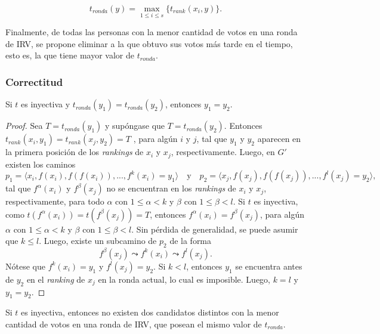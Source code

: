 \begin{equation}\label{eq:max-rank-time}
   t_{ronda}(y) = \underset{1 \leq i \leq s}{\max} \{ t_{rank}(x_i, y) \}. 
\end{equation}

Finalmente, de todas las personas con la menor cantidad de votos en una ronda de IRV, se propone eliminar a la que obtuvo sus votos m\'as tarde en el tiempo, esto es, la que tiene mayor valor  de $t_{ronda}$.

\subsubsection{Correctitud}
\begin{theorem}\label{theorem:irv}
    Si $t$ es inyectiva y $t_{ronda}(y_1) = t_{ronda}(y_2)$, entonces $y_1 = y_2$.
\end{theorem}

\begin{proof}
    Sea $T = t_{ronda}(y_1)$ y sup\'ongase que $T = t_{ronda}(y_2)$. Entonces $t_{rank}(x_{i}, y_1) = t_{rank}(x_{j}, y_2) = T$ , para alg\'un $i$ y $j$, tal que $y_1$ y $y_2$ aparecen en la primera posici\'on de los \textit{rankings} de $x_{i}$ y $x_{j}$, respectivamente. Luego, en $G'$ existen los caminos
    $$
    p_1 = \langle x_{i}, f(x_i), f(f(x_i)), ..., f^k(x_i) = y_1 \rangle \quad \text{y} \quad p_2 = \langle x_{j}, f(x_j), f(f(x_j)), ..., f^l(x_j) = y_2 \rangle,
    $$
    tal que $f^\alpha(x_i)$ y $f^\beta(x_j)$ no se encuentran en los \textit{rankings} de $x_i$ y $x_j$, respectivamente, para todo $\alpha$ con $ 1 \leq \alpha < k$ y $\beta$ con $ 1 \leq \beta < l$. Si $t$ es inyectiva, como $t(f^\alpha(x_i)) = t(f^\beta(x_j)) = T$, entonces $f^\alpha(x_i) = f^\beta(x_j)$, para alg\'un $\alpha$ con $ 1 \leq \alpha < k$ y $\beta$ con $ 1 \leq \beta < l$. Sin p\'erdida de generalidad, se puede asumir que $k \leq l$. Luego, existe un subcamino de $p_2$ de la forma
    $$
        f^\beta(x_j) \leadsto f^k(x_i) \leadsto f^l(x_j).
    $$
    N\'otese que $f^k(x_i) = y_1$ y $f^l(x_j) = y_2$.  Si $k<l$, entonces $y_1$ se encuentra antes de $y_2$ en el \textit{ranking} de $x_j$ en la ronda actual, lo cual es imposible. Luego, $k=l$ y $y_1 = y_2$.
\end{proof}

\begin{corollary}
    Si $t$ es inyectiva, entonces no existen dos candidatos distintos con la menor cantidad de votos en una ronda de IRV, que posean el mismo valor de $t_{ronda}$.
\end{corollary}

